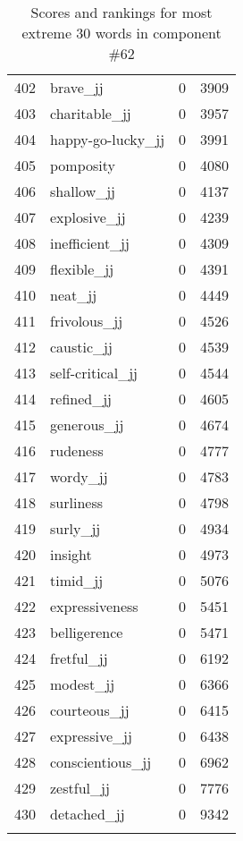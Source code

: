\begin{longtable}[!htbp]{| rlr@{.}l |}
    402 & brave\_jj & 0 & 3909 \\
    403 & charitable\_jj & 0 & 3957 \\
    404 & happy-go-lucky\_jj & 0 & 3991 \\
    405 & pomposity & 0 & 4080 \\
    406 & shallow\_jj & 0 & 4137 \\
    407 & explosive\_jj & 0 & 4239 \\
    408 & inefficient\_jj & 0 & 4309 \\
    409 & flexible\_jj & 0 & 4391 \\
    410 & neat\_jj & 0 & 4449 \\
    411 & frivolous\_jj & 0 & 4526 \\
    412 & caustic\_jj & 0 & 4539 \\
    413 & self-critical\_jj & 0 & 4544 \\
    414 & refined\_jj & 0 & 4605 \\
    415 & generous\_jj & 0 & 4674 \\
    416 & rudeness & 0 & 4777 \\
    417 & wordy\_jj & 0 & 4783 \\
    418 & surliness & 0 & 4798 \\
    419 & surly\_jj & 0 & 4934 \\
    420 & insight & 0 & 4973 \\
    421 & timid\_jj & 0 & 5076 \\
    422 & expressiveness & 0 & 5451 \\
    423 & belligerence & 0 & 5471 \\
    424 & fretful\_jj & 0 & 6192 \\
    425 & modest\_jj & 0 & 6366 \\
    426 & courteous\_jj & 0 & 6415 \\
    427 & expressive\_jj & 0 & 6438 \\
    428 & conscientious\_jj & 0 & 6962 \\
    429 & zestful\_jj & 0 & 7776 \\
    430 & detached\_jj & 0 & 9342 \\
    \hline
    \caption{Scores and rankings for most extreme 30 words in component \#62} \\
\end{longtable}
